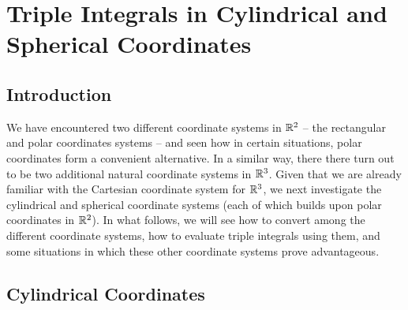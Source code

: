 \section{Triple Integrals in Cylindrical and Spherical Coordinates} \label{S:11.8.Triple_Integrals_Cylindrical_Spherical}

\vspace*{-14 pt}

\subsection*{Introduction}

We have encountered two different coordinate systems in $\mathbb{R}^2$ -- the rectangular and polar coordinates systems -- and seen how in certain situations, polar coordinates form a convenient alternative.  In a similar way, there there turn out to be two additional natural coordinate systems in $\mathbb{R}^3$.  Given that we are already familiar with the Cartesian coordinate system for $\mathbb{R}^3$,  we next investigate the cylindrical and spherical coordinate systems (each of which builds upon polar coordinates in $\mathbb{R}^2$).  In what follows, we will see how to convert among the different coordinate systems, how to evaluate triple integrals using them, and some situations in which these other coordinate systems prove advantageous.



\subsection*{Cylindrical Coordinates}

